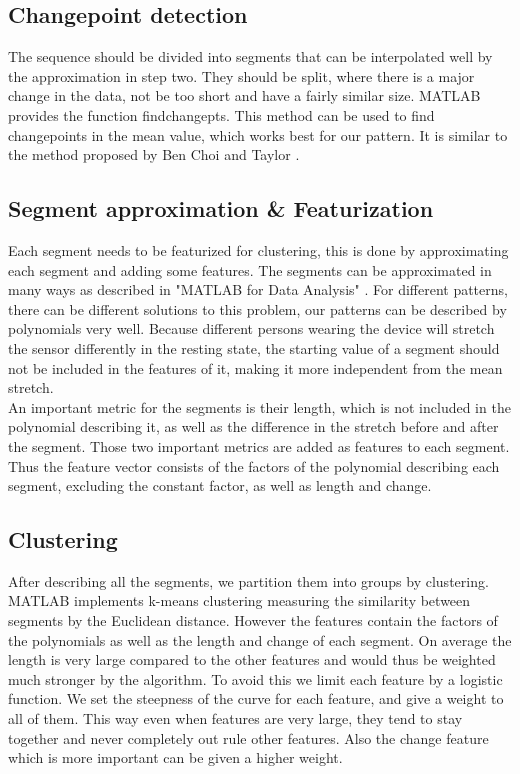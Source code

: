\documentclass{article}
\begin{document}
\subsection{Changepoint detection}
The sequence should be divided into segments that can be interpolated well by the approximation in step two. They should be split, where there is a major change in the data, not be too short and have a fairly similar size. MATLAB provides the function findchangepts. This method can be used to find changepoints in the mean value, which works best for our pattern. It is similar to the method proposed by Ben Choi and Taylor \cite{BenChoi, Taylor}.
\subsection{Segment approximation & Featurization}
Each segment needs to be featurized for clustering, this is done by approximating each segment and adding some features. The segments can be approximated in many ways as described in "MATLAB for Data Analysis" \cite{dataanal37}. For different patterns, there can be different solutions to this problem, our patterns can be described by polynomials very well. Because different persons wearing the device will stretch the sensor differently in the resting state, the starting value of a segment should not be included in the features of it, making it more independent from the mean stretch. \\
An important metric for the segments is their length, which is not included in the polynomial describing it, as well as the difference in the stretch before and after the segment. Those two important metrics are added as features to each segment. Thus the feature vector consists of the factors of the polynomial describing each segment, excluding the constant factor, as well as length and change. \\
\subsection{Clustering}
After describing all the segments, we partition them into groups by clustering. MATLAB implements k-means clustering measuring the similarity between segments by the Euclidean distance. However the features contain the factors of the polynomials as well as the length and change of each segment. On average the length is very large compared to the other features and would thus be weighted much stronger by the algorithm. To avoid this we limit each feature by a logistic function. We set the steepness of the curve for each feature, and give a weight to all of them. This way even when features are very large, they tend to stay together and never completely out rule other features. Also the change feature which is more important can be given a higher weight.
\end{document}
